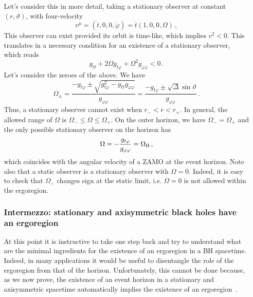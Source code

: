 \documentclass[11pt]{article}
\newcommand{\be}{\begin{equation}}
\newcommand{\ee}{\end{equation}}
\numberwithin{equation}{section} %
\begin{document}
Let's consider this in more detail, taking a stationary observer at constant $(r,\vartheta)$, with four-velocity
%
\be
v^{\mu}=(\dot{t},0,0,\dot{\varphi})=\dot{t}(1,0,0,\Omega)\,,
\ee
%
This observer can exist provided its orbit is time-like, which implies $v^2<0$. This translates in a necessary condition for an existence of a stationary observer, which reads
%
\be
g_{tt}+2\Omega g_{t\varphi}+\Omega^2g_{\varphi\varphi}<0\,.
\ee
%
Let's consider the zeroes of the above. We have
%
\be
\Omega_{\pm}=\frac{-g_{t\varphi}\pm\sqrt{g_{t\varphi}^2-g_{tt}g_{\varphi\varphi}}}{g_{\varphi\varphi}}=\frac{-g_{t\varphi}\pm\sqrt{\Delta}\sin\vartheta}{g_{\varphi\varphi}}\,.
\ee
%
Thus, a stationary observer cannot exist when $r_-<r<r_+$. In general, the allowed range of $\Omega$ is $\Omega_-\leq\Omega\leq\Omega_+$.
On the outer horizon, we have $\Omega_-=\Omega_+$ and the only possible stationary observer on the horizon has 
%
\be
\Omega=-\frac{g_{t\varphi}}{g_{\varphi\varphi}}=\Omega_{\rm H}\,,
\ee
%
which coincides with the angular velocity of a ZAMO at the event horizon. Note also that a static observer is a stationary observer with $\Omega=0$. Indeed, it is easy to check that $\Omega_-$ changes sign at the static limit, i.e. $\Omega=0$ is not allowed within the ergoregion.

\subsubsection{Intermezzo: stationary and axisymmetric black holes have an ergoregion}\label{sec:ERhor}
At this point it is instructive to take one step back and try to understand what are the minimal ingredients for the existence of an ergoregion in a BH spacetime. Indeed, in many applications it would be useful to disentangle the role of the ergoregion from that of the horizon. Unfortunately, this cannot be done because, as we now prove, the existence of an event horizon in a stationary and axisymmetric spacetime automatically implies the existence of an ergoregion~\cite{Cardoso:2012zn}.
\end{document}
